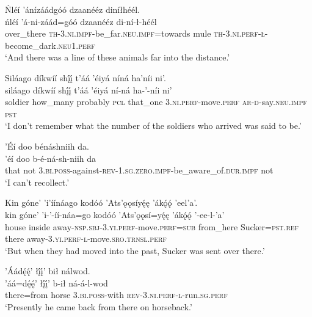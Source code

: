 \ea\label{ex:text1-50-4}
Ńléí ’ánízáádgóó dzaanééz diníłhéél.\\
\gll ńléí	’á-ni-záád=góó	dzaanééz	di-ní-ł-héél\\
     over\_there	\textsc{th}-3.\textsc{ni}.\textsc{impf}-be\_far.\textsc{neu}.\textsc{impf}=towards	mule	\textsc{th}-3.\textsc{ni}.\textsc{perf}-\textsc{ł}-become\_dark.\textsc{neu}1.\textsc{perf}\\
\glt `And there was a line of these animals far into the distance.'
\z

\ea\label{ex:text1-50-5}
Siláago díkwíí shį́į́ t’áá ’éiyá níná ha’níi ni’.\\
\gll siláago	díkwíí	shį́į́	t’áá ’éiyá	ní-ná	ha-’-níi	ni’\\
     soldier	how\_many	probably	\textsc{pcl} that\_one	3.\textsc{ni}.\textsc{perf}-move.\textsc{perf}	\textsc{ar}-\textsc{d}-say.\textsc{neu}.\textsc{impf}	\textsc{pst}\\
\glt `I don't remember what the number of the soldiers who arrived was said to be.'
\z

\ea\label{ex:text1-50-6}
’Éí doo bénáshniih da.\\
\gll ’éí	doo	b-é-ná-sh-niih	da\\
     that	not	3.\textsc{bi}.\textsc{poss}-against-\textsc{rev}-1.\textsc{sg}.\textsc{zero}.\textsc{impf}-be\_aware\_of.\textsc{dur}.\textsc{impf}	not\\
\glt `I can't recollect.'
\z

\ea\label{ex:text1-50-7}
Kin góne’ ’i’íínáago kodóó ’Ats’ǫǫsíyę́ę ’ákǫ́ǫ́ ’eel’a’.\\
\gll kin	góne’	’i-’-íí-náa=go	kodóó	’Ats’ǫǫsí=yę́ę	’ákǫ́ǫ́	’-ee-l-’a’\\
     house	inside	away-\textsc{nsp}.\textsc{sbj}-3.\textsc{yi}.\textsc{perf}-move.\textsc{perf}=\textsc{sub}	from\_here	Sucker=\textsc{pst}.\textsc{ref}	there	away-3.\textsc{yi}.\textsc{perf}-\textsc{l}-move.\textsc{sro}.\textsc{trnsl}.\textsc{perf}\\
\glt `But when they had moved into the past, Sucker was sent over there.'
\z

\ea\label{ex:text1-50-8}
’Áádę́ę́’ łį́į́’ bił nálwod.\\
\gll ’áá=dę́ę́’	łį́į́’	b-ił	ná-á-l-wod\\
     there=from	horse	3.\textsc{bi}.\textsc{poss}-with	\textsc{rev}-3.\textsc{ni}.\textsc{perf}-\textsc{l}-run.\textsc{sg}.\textsc{perf}\\
\glt `Presently he came back from there on horseback.'
\z

